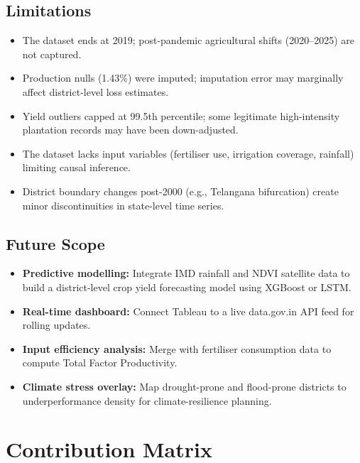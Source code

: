 \documentclass[10pt]{article}
\begin{document}
\subsection{Limitations}
\begin{itemize}[leftmargin=*, topsep=2pt, itemsep=1pt]
  \item The dataset ends at 2019; post-pandemic agricultural shifts
        (2020–2025) are not captured.
  \item Production nulls (1.43\%) were imputed; imputation error may
        marginally affect district-level loss estimates.
  \item Yield outliers capped at 99.5th percentile; some legitimate
        high-intensity plantation records may have been down-adjusted.
  \item The dataset lacks input variables (fertiliser use, irrigation
        coverage, rainfall) limiting causal inference.
  \item District boundary changes post-2000 (e.g., Telangana bifurcation)
        create minor discontinuities in state-level time series.
\end{itemize}

\subsection{Future Scope}
\begin{itemize}[leftmargin=*, topsep=2pt, itemsep=1pt]
  \item \textbf{Predictive modelling:} Integrate IMD rainfall and NDVI
        satellite data to build a district-level crop yield forecasting
        model using XGBoost or LSTM.
  \item \textbf{Real-time dashboard:} Connect Tableau to a live
        data.gov.in API feed for rolling updates.
  \item \textbf{Input efficiency analysis:} Merge with fertiliser
        consumption data to compute Total Factor Productivity.
  \item \textbf{Climate stress overlay:} Map drought-prone and
        flood-prone districts to underperformance density for
        climate-resilience planning.
\end{itemize}

\section{Contribution Matrix}
\end{document}
